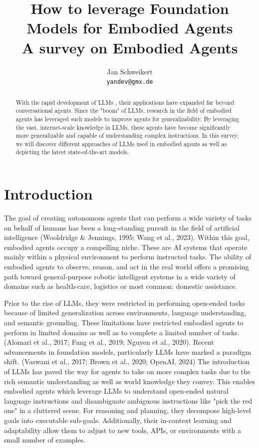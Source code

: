 \documentclass[11pt]{article}
\title{%
  How to leverage Foundation Models for Embodied Agents\\
  \large A survey on Embodied Agents}
\author{
  Jan Schweikert \\
  \texttt{yandev@gmx.de}  %
}
\begin{document}
\maketitle
\begin{abstract}
With the rapid development of LLMs , their applications have expanded far beyond conversational agents. 
Since the "boom" of LLMs, research in the field of embodied agents has leveraged such models to improve agents for generalizability. By leveraging the vast, internet-scale knowledge in LLMs, these agents have become significantly more generalizable and capable of understanding complex instructions. In this survey, we will discover different approaches of LLMs used in embodied agents as well as depicting the latest state-of-the-art models.
\end{abstract}

\section{Introduction}
The goal of creating autonomous agents that can perform a wide variety of tasks on behalf of humans has been a long-standing pursuit in the field of artificial intelligence (Wooldridge \& Jennings, 1995; Wang et al., 2023). Within this goal, embodied agents occupy a compelling niche. These are AI systems that operate mainly within a physical environment to perform instructed tasks.
The ability of embodied agents to observe, reason, and act in the real world offers a promising path toward general-purpose robotic intelligent systems in a wide variety of domains such as health-care, logistics or most common: domestic assistance.
\hfill \break

Prior to the rise of LLMs, they were restricted in performing open-ended tasks because of limited generalization across environments, language understanding, and semantic grounding. These limitations have restricted embodied agents to perform in limited domains as well as to complete a limited number of tasks. (Alomari et al., 2017; Fang et al., 2019; Nguyen et al., 2020).
Recent advancements in foundation models, particularly LLMs have marked a paradigm shift. (Vaswani et al., 2017; Brown et al., 2020; OpenAI, 2024)
The introduction of LLMs has paved the way for agents to take on more complex tasks due to the rich semantic understanding as well as world knowledge they convey. This enables embodied agents which leverage LLMs to understand open-ended natural language instructions and disambiguate ambiguous instructions like "pick the red one" in a cluttered scene. For reasoning and planning, they decompose high-level goals into executable sub-goals. Additionally, their in-context learning and adaptability allow them to adjust to new tools, APIs, or environments with a small number of examples.
\hfill \break
\end{document}
